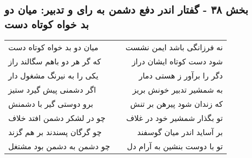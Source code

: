 \begin{center}
\section*{بخش ۳۸ - گفتار اندر دفع دشمن به رای و تدبیر: میان دو بد خواه کوتاه دست}
\label{sec:038}
\begin{longtable}{l p{0.5cm} r}
میان دو بد خواه کوتاه دست
&&
نه فرزانگی باشد ایمن نشست
\\
که گر هر دو باهم سگالند راز
&&
شود دست کوتاه ایشان دراز
\\
یکی را به نیرنگ مشغول دار
&&
دگر را برآور ز هستی دمار
\\
اگر دشمنی پیش گیرد ستیز
&&
به شمشیر تدبیر خونش بریز
\\
برو دوستی گیر با دشمنش
&&
که زندان شود پیرهن بر تنش
\\
چو در لشکر دشمن افتد خلاف
&&
تو بگذار شمشیر خود در غلاف
\\
چو گرگان پسندند بر هم گزند
&&
بر آساید اندر میان گوسفند
\\
چو دشمن به دشمن بود مشتغل
&&
تو با دوست بنشین به آرام دل
\\
\end{longtable}
\end{center}

